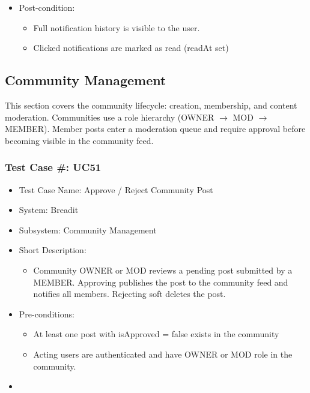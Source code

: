 \begin{itemize}
  \item Post-condition:
\begin{itemize}
  \item Full notification history is visible to the user.
  \item Clicked notifications are marked as read (readAt set)
\end{itemize}
\end{itemize}

\subsection{Community Management}

This section covers the community lifecycle: creation, membership, and content moderation. Communities use a role hierarchy (OWNER $\rightarrow$ MOD $\rightarrow$ MEMBER). Member posts enter a moderation queue and require approval before becoming visible in the community feed.

\subsubsection{Test Case \#: UC51}
\begin{itemize}
  \item Test Case Name: Approve / Reject Community Post
  \item System: Breadit
  \item Subsystem: Community Management
  \item Short Description:
\begin{itemize}
  \item Community OWNER or MOD reviews a pending post submitted by a MEMBER. Approving publishes the post to the community feed and notifies all members. Rejecting soft deletes the post.
\end{itemize}
  \item Pre-conditions:
\begin{itemize}
  \item At least one post with isApproved = false exists in the community
  \item Acting users are authenticated and have OWNER or MOD role in the community.
\end{itemize}
  \item 
\end{itemize}


